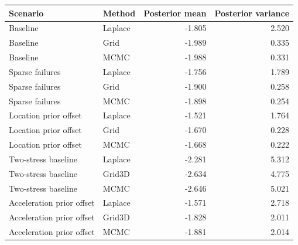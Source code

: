 \begin{tabular}{llrr}
\toprule
Scenario & Method & Posterior mean & Posterior variance \\
\midrule
Baseline & Laplace & -1.805 & 2.520 \\
Baseline & Grid & -1.989 & 0.335 \\
Baseline & MCMC & -1.988 & 0.331 \\
Sparse failures & Laplace & -1.756 & 1.789 \\
Sparse failures & Grid & -1.900 & 0.258 \\
Sparse failures & MCMC & -1.898 & 0.254 \\
Location prior offset & Laplace & -1.521 & 1.764 \\
Location prior offset & Grid & -1.670 & 0.228 \\
Location prior offset & MCMC & -1.668 & 0.222 \\
Two-stress baseline & Laplace & -2.281 & 5.312 \\
Two-stress baseline & Grid3D & -2.634 & 4.775 \\
Two-stress baseline & MCMC & -2.646 & 5.021 \\
Acceleration prior offset & Laplace & -1.571 & 2.718 \\
Acceleration prior offset & Grid3D & -1.828 & 2.011 \\
Acceleration prior offset & MCMC & -1.881 & 2.014 \\
\bottomrule
\end{tabular}
